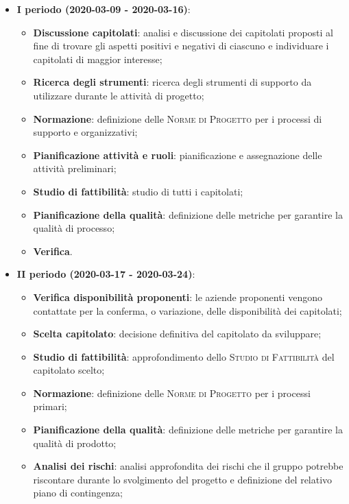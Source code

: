 \documentclass[../piano-di-progetto.tex]{subfiles}
\begin{document}
\begin{itemize}

    \item \textbf{I periodo (2020-03-09 - 2020-03-16)}:
        \begin{itemize}
            \item \textbf{Discussione capitolati}: analisi e discussione dei capitolati proposti al fine di trovare gli aspetti positivi e negativi di ciascuno e individuare i capitolati di maggior interesse;
            \item \textbf{Ricerca degli strumenti}: ricerca degli strumenti di supporto da utilizzare durante le attività di progetto;
            \item \textbf{Normazione}: definizione delle \textsc{Norme di Progetto} per i processi di supporto e organizzativi;
            \item \textbf{Pianificazione attività e ruoli}: pianificazione e assegnazione delle attività preliminari;
            \item \textbf{Studio di fattibilità}: studio di tutti i capitolati;
            \item \textbf{Pianificazione della qualità}: definizione delle metriche per garantire la qualità di processo;
            \item \textbf{Verifica}.
        \end{itemize}
        \item \textbf{II periodo (2020-03-17 - 2020-03-24)}:
            \begin{itemize}
                \item \textbf{Verifica disponibilità proponenti}: le aziende proponenti vengono contattate per la conferma, o variazione, delle disponibilità dei capitolati;
                \item \textbf{Scelta capitolato}: decisione definitiva del capitolato da sviluppare;
                \item \textbf{Studio di fattibilità}: approfondimento dello \textsc{Studio di Fattibilità} del capitolato scelto;
                \item \textbf{Normazione}: definizione delle \textsc{Norme di Progetto} per i processi primari;
                \item \textbf{Pianificazione della qualità}: definizione delle metriche per garantire la qualità di prodotto;
                \item \textbf{Analisi dei rischi}: analisi approfondita dei rischi che il gruppo potrebbe riscontare durante lo svolgimento del progetto e definizione del relativo piano di contingenza;

\end{itemize}
\end{itemize}
\end{document}
